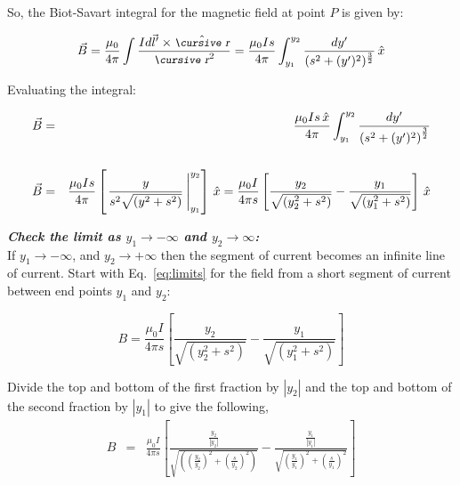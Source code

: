 \documentclass[12pt]{article}
\begin{document}
\begin{flushleft}
So, the Biot-Savart integral for the magnetic field at point $P$ is given by:

\begin{equation*}
\vec{B}  = \frac{ \mu_{0} }{4\pi} \int \frac{ Id\vec{l}^{\prime} \times  \hat{\text{\small\slshape\cursive r}}}{\text{\small\slshape\cursive r}^{2}}  
= \frac{ \mu_{0}Is }{4\pi} \int_{y_{1}}^{y_{2}} \frac{ dy^{\prime} }{(s^{2}+(y^{\prime})^{2})^{\frac{3}{2}}} \, \hat{x}
\end{equation*}

Evaluating the integral:

\begin{eqnarray*}
\vec{B} & =& \frac{ \mu_{0} Is \, \hat{x}}{4\pi} \int_{y_{1}}^{y_{2}} \frac{dy^{\prime}}{\left( s^{2} + (y^{\prime})^{2} \right)^{\frac{3}{2}}} \\
\vspace{.05in}\\
\vec{B} & =& \frac{ \mu_{0} Is}{4\pi} \left[ \left. \frac{y}{s^{2}\sqrt{(y^{2}+s^{2})}} \:  \right\vert_{y_{1}}^{y_{2}}  \right] \, \hat{x} =  \frac{ \mu_{0} I}{4\pi s} \left[ \frac{y_{2}}{\sqrt{(y_{2}^{2}+s^{2})}} -  \frac{y_{1}}{\sqrt{(y_{1}^{2}+s^{2})}} \right] \, \hat{x}
\end{eqnarray*}

\textbf{\textit{Check the limit as $y_{1}\rightarrow -\infty$ and $y_{2} \rightarrow \infty$:}}\\
\vspace{.1in}
If $y_{1}\rightarrow -\infty$, and $y_{2}\rightarrow +\infty$ then the segment of current becomes an infinite line of current.  Start with Eq.~\ref{eq:limits} for the field from a short segment of current between end points $y_{1}$ and $y_{2}$: 

\begin{equation}
B = \frac{ \mu_{0} I}{4\pi s} \left[ \frac{y_{2}}{\sqrt{(y_{2}^{2}+s^{2})}} -  \frac{y_{1}}{\sqrt{(y_{1}^{2}+s^{2})}} \right]
\label{eq:limits} 
\end{equation}

\vspace{.1in}
Divide the top and bottom of the first fraction by $|y_{2}|$ and the top and bottom of the second fraction by $|y_{1}|$ to give the following,  
\begin{eqnarray*}
B & = & \frac{ \mu_{0} I}{4\pi s} \left[ \frac{\frac{y_{2}}{|y_{2}|}}{\sqrt{\left( \left( \frac{y_{2}}{y_{2}} \right)^{2}+\left( \frac{s}{y_{2}} \right)^{2} \right)}} -  
\frac{ \frac{y_{1}}{|y_{1}|} }{ \sqrt{\left( \frac{y_{1}}{y_{1} }\right)^{2} + \left( \frac{s}{y_{1}} \right)^{2}} } \right] \\
\end{eqnarray*}


\end{flushleft}
\end{document}
